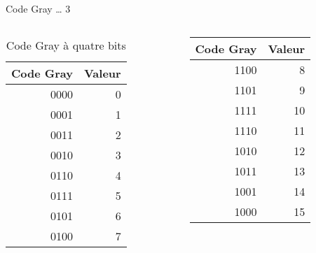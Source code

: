 \documentclass[presentation]{beamer}
\begin{document}
\begin{frame}[label={sec:org5654390}]{Code Gray \ldots{} 3}
\begin{columns}
\begin{column}{0.48\columnwidth}
\begin{block}{}
\begin{table}[htbp]
\caption{\label{tab:orgb4b8e30}Code Gray à quatre bits}
\centering
\begin{tabular}{rr}
Code Gray & Valeur\\[0pt]
\hline
0000 & 0\\[0pt]
0001 & 1\\[0pt]
0011 & 2\\[0pt]
0010 & 3\\[0pt]
0110 & 4\\[0pt]
0111 & 5\\[0pt]
0101 & 6\\[0pt]
0100 & 7\\[0pt]
\end{tabular}
\end{table}
\end{block}
\end{column}


\begin{column}{0.48\columnwidth}
\begin{block}{}
\begin{center}
\begin{tabular}{rr}
Code Gray & Valeur\\[0pt]
\hline
1100 & 8\\[0pt]
1101 & 9\\[0pt]
1111 & 10\\[0pt]
1110 & 11\\[0pt]
1010 & 12\\[0pt]
1011 & 13\\[0pt]
1001 & 14\\[0pt]
1000 & 15\\[0pt]
\end{tabular}
\end{center}
\end{block}
\end{column}
\end{columns}
\end{frame}
\end{document}
